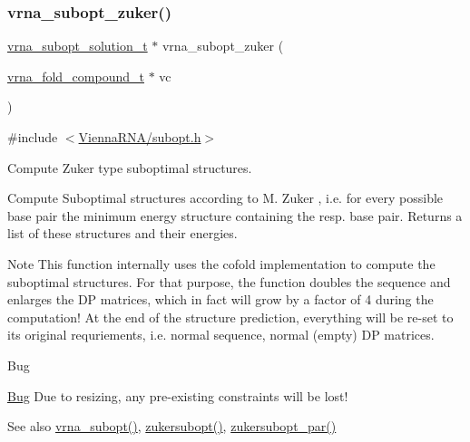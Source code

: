 \subsubsection{\texorpdfstring{vrna\+\_\+subopt\+\_\+zuker()}{vrna\_subopt\_zuker()}}
{\footnotesize\ttfamily \hyperlink{subopt_8h_a01ae9a0f27d245d89f705afd843fc457}{vrna\+\_\+subopt\+\_\+solution\+\_\+t} $\ast$ vrna\+\_\+subopt\+\_\+zuker (\begin{DoxyParamCaption}\item[{\hyperlink{group__fold__compound_ga1b0cef17fd40466cef5968eaeeff6166}{vrna\+\_\+fold\+\_\+compound\+\_\+t} $\ast$}]{vc }\end{DoxyParamCaption})}



{\ttfamily \#include $<$\hyperlink{subopt_8h}{Vienna\+R\+N\+A/subopt.\+h}$>$}



Compute Zuker type suboptimal structures. 

Compute Suboptimal structures according to M. Zuker \cite{zuker:1989} , i.\+e. for every possible base pair the minimum energy structure containing the resp. base pair. Returns a list of these structures and their energies.

\begin{DoxyNote}{Note}
This function internally uses the cofold implementation to compute the suboptimal structures. For that purpose, the function doubles the sequence and enlarges the DP matrices, which in fact will grow by a factor of 4 during the computation! At the end of the structure prediction, everything will be re-\/set to its original requriements, i.\+e. normal sequence, normal (empty) DP matrices.
\end{DoxyNote}
\begin{DoxyRefDesc}{Bug}
\item[\hyperlink{bug__bug000001}{Bug}]Due to resizing, any pre-\/existing constraints will be lost!\end{DoxyRefDesc}


\begin{DoxySeeAlso}{See also}
\hyperlink{group__subopt__wuchty_ga0f11d738fb8c8b1885a90c11c8931ff6}{vrna\+\_\+subopt()}, \hyperlink{group__subopt__zuker_ga0d5104e3ecf119d8eabd40aa5fe47f90}{zukersubopt()}, \hyperlink{group__subopt__zuker_gab6d0ea8cc1d02f6dd831ca81043c9eb8}{zukersubopt\+\_\+par()}
\end{DoxySeeAlso}

